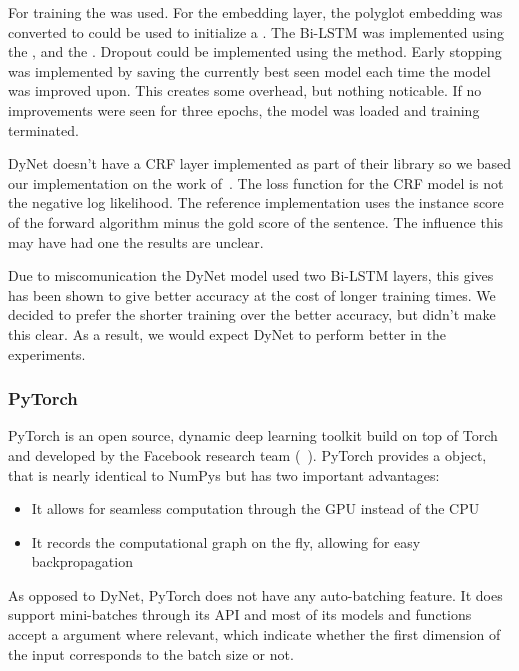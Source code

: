 For training the  was used. For the embedding layer, the
polyglot embedding was converted to could be used to initialize a
. The Bi-LSTM was implemented using the
, and the . Dropout could be implemented
using the  method. Early stopping was implemented by saving the
currently best seen model each time the model was improved upon. This creates
some overhead, but nothing noticable. If no improvements were seen for three
epochs, the model was loaded and training terminated.

DyNet doesn't have a CRF layer implemented as part of their library so we based
our implementation on the work of~\cite{plank2016multilingual}. The loss
function for the CRF model is not the negative log likelihood. The reference
implementation uses the instance score of the forward algorithm minus the
gold score of the sentence. The influence this may have had one the results are
unclear.

Due to miscomunication the DyNet model used two Bi-LSTM layers, this gives has
been shown to give better accuracy at the cost of longer training times. We
decided to prefer the shorter training over the better accuracy, but didn't make
this clear. As a result, we would expect DyNet to perform better in the
experiments. 


\subsubsection*{PyTorch}\label{sec:setup-implementations-pytorch}

PyTorch is an open source, dynamic deep learning toolkit build on top of Torch
and developed by the Facebook research team (~\cite{yegulalp2017facebook}).
PyTorch provides a  object, that is nearly identical to NumPys
 but has two important advantages:

\begin{itemize}
    \item It allows for seamless computation through the GPU instead of the CPU
    \item It records the computational graph on the fly, allowing for easy
        backpropagation
\end{itemize}

As opposed to DyNet, PyTorch does not have any auto-batching feature. It does
support mini-batches through its API and most of its models and functions accept
a  argument where relevant, which indicate whether the first
dimension of the input corresponds to the batch size or not.

